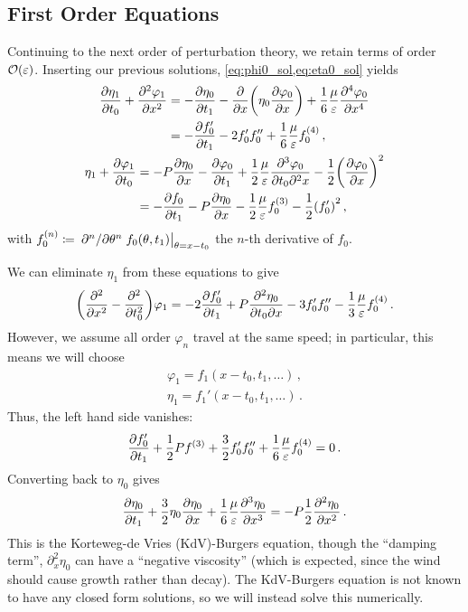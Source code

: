 \documentclass{jfm}
\renewcommand*{\epsilon}{\varepsilon}
\begin{document}
\subsection{\label{sec:int_first_order} First Order Equations}
Continuing to the next order of perturbation theory, we retain terms of
order $\order{\epsilon}$.
Inserting our previous solutions, \cref{eq:phi0_sol,eq:eta0_sol} yields
\begin{gather}
  \begin{aligned}
    \pdv{\eta_1}{t_0} + \pdv[2]{\varphi_{1}}{x} &=
      -\pdv{\eta_0}{t_1} - \pdv{x} \pqty{\eta_0 \pdv{\varphi_0}{x}} +
      \frac{1}{6} \frac{\mu}{\epsilon} \pdv[4]{\varphi_0}{x} \\
      &= -\pdv{f_0'}{t_1} - 2 f_0' f_0'' + \frac{1}{6}
      \frac{\mu}{\epsilon} f_0^{(4)} \,,
  \end{aligned}
  \\
  \begin{aligned}
    \eta_1 + \pdv{\varphi_1}{t_0} &= -P \pdv{\eta_0}{x} -\pdv{\varphi_0}{t_1}
      + \frac{1}{2} \frac{\mu}{\epsilon} \frac{\partial^3 \varphi_0}
        {\partial t_0 \partial^2 x}
      - \frac{1}{2} \pqty{ \pdv{\varphi_0}{x} }^2 \\
    &= -\pdv{f_0}{t_1} - P \pdv{\eta_0}{x} - \frac{1}{2} \frac{\mu}{\epsilon}
      f_0^{(3)} - \frac{1}{2} \pqty{f_0'}^2 \,,
  \end{aligned}
\end{gather}
with $f_0^{(n)} \coloneqq \eval{\pdv*[n]{\theta}
f_0(\theta,t_1)}_{\theta=x-t_0}$ the $n$-th derivative of $f_0$.

We can eliminate $\eta_1$ from these equations to give
\begin{equation}
  \pqty{\pdv[2]{x} - \pdv[2]{t_0}} \varphi_1 = -2 \pdv{f_0'}{t_1} +
    P\pdv{\eta_0}{t_0}{x} - 3 f_0' f_0'' - \frac{1}{3} \frac{\mu}{\epsilon}
    f_0^{(4)} \,.
\end{equation}
However, we assume all order $\varphi_{n}$ travel at the same speed; in
particular, this means we will choose
\begin{align}
  \varphi_1 = f_1(x-t_0,t_1,\ldots) \,, \label{eq:phi1_sol} \\
  \eta_1 = f_1'(x-t_0,t_1,\ldots) \,. \label{eq:eta1_sol}
\end{align}
Thus, the left hand side vanishes:
\begin{equation}
  \pdv{f_0'}{t_1} + \frac{1}{2} P f^{(3)} + \frac{3}{2} f_0' f_0''
    + \frac{1}{6} \frac{\mu}{\epsilon} f_0^{(4)} = 0\,.
\end{equation}
Converting back to $\eta_0$ gives
\begin{equation}
  \pdv{\eta_0}{t_1} + \frac{3}{2}
    \eta_0 \pdv{\eta_0}{x} + \frac{1}{6} \frac{\mu}{\epsilon}
    \pdv[3]{\eta_0}{x} = -P \frac{1}{2} \pdv[2]{\eta_0}{x} \,.
  \label{eq:kdv_burgers}
\end{equation}
This is the Korteweg-de Vries (KdV)-Burgers equation, though the
``damping term'', $\partial^2_x \eta_0$ can have a ``negative
viscosity'' (which is expected, since the wind should cause growth
rather than decay).
The KdV-Burgers equation is not known to have any closed form solutions,
so we will instead solve this numerically.
\end{document}
